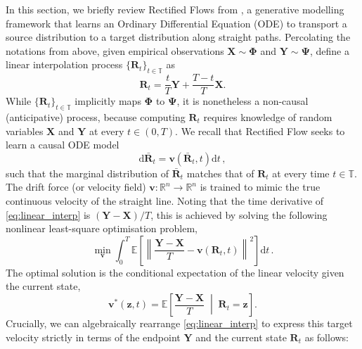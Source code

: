 \documentclass{article}
\theoremstyle{definition}
\begin{document}
In this section, we briefly review Rectified Flows from \cite{liu_flow_2023}, a generative modelling framework that learns an Ordinary Differential Equation (ODE) to transport a source distribution to a target distribution along straight paths. Percolating the notations from above, given empirical observations $\boldsymbol{X}\sim \boldsymbol{\Phi}$ and $\boldsymbol{Y} \sim \boldsymbol{\Psi}$, define a linear interpolation process $\{\boldsymbol{R}_t\}_{t\in\mathbb{T}}$ as
\begin{equation}
    \boldsymbol{R}_t = \frac{t}{T}\boldsymbol{Y} + \frac{T-t}{T}\boldsymbol{X}. \label{eq:linear_interp}
\end{equation}
While $\{\boldsymbol{R}_t\}_{t\in\mathbb{T}}$ implicitly maps $\boldsymbol{\Phi}$ to $\boldsymbol{\Psi}$, it is nonetheless a non-causal (anticipative) process, because computing $\boldsymbol{R}_t$ requires knowledge of random variables $\boldsymbol{X}$ and $\boldsymbol{Y}$ at every $t\in(0,T)$. We recall that Rectified Flow seeks to learn a causal ODE model
\begin{equation}
    \mathrm{d}\bar{\boldsymbol{R}}_t = \boldsymbol{v}(\bar{\boldsymbol{R}}_t, t)\mathrm{d}t \, , \label{odemodelbase}
\end{equation}
such that the marginal distribution of $\bar{\boldsymbol{R}}_t$ matches that of $\boldsymbol{R}_t$ at every time $t\in\mathbb{T}$. The drift force (or velocity field) $\boldsymbol{v}: \mathbb{R}^n \to \mathbb{R}^n$ is trained to mimic the true continuous velocity of the straight line. Noting that the time derivative of \eqref{eq:linear_interp} is $(\boldsymbol{Y}-\boldsymbol{X})/T$, this is achieved by solving the following nonlinear least-square optimisation problem,
\begin{equation}
    \min_{\boldsymbol{v}} \int_{0}^{T} \mathbb{E}\left[ \left\| \frac{\boldsymbol{Y} - \boldsymbol{X}}{T} - \boldsymbol{v}(\boldsymbol{R}_t, t) \right\|^2 \right] \mathrm{d}t \, . \label{eq:rectified_flow_obj}
\end{equation}
The optimal solution is the conditional expectation of the linear velocity given the current state,
\begin{equation}
\boldsymbol{v}^*(\boldsymbol{z},t) = \mathbb{E}\left[\frac{\boldsymbol{Y} - \boldsymbol{X}}{T} \;\middle|\; \boldsymbol{R}_t = \boldsymbol{z}\right]. \label{eq:rf_conditional_exp}
\end{equation}
Crucially, we can algebraically rearrange \eqref{eq:linear_interp} to express this target velocity strictly in terms of the endpoint $\boldsymbol{Y}$ and the current state $\boldsymbol{R}_t$ as follows:
\end{document}
